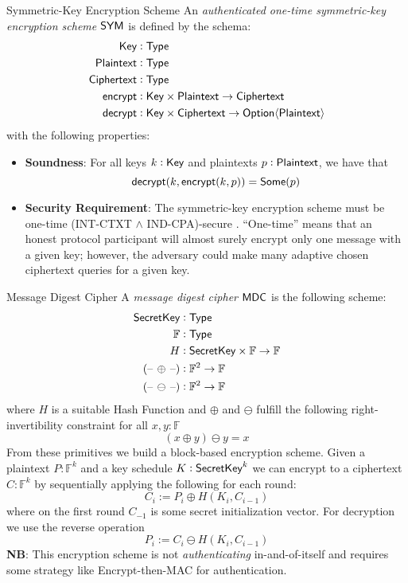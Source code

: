 \begin{definitiontoc}{Symmetric-Key Encryption Scheme} \label{def:abstract-symm}
    An \emph{authenticated one-time symmetric-key encryption scheme} ${\textsf{SYM}}$ is defined by the schema:
    \begin{align*}
        {\textsf{Key}} &: {\textsf{Type}} \\
        {\textsf{Plaintext}} &: {\textsf{Type}} \\
        {\textsf{Ciphertext}} &: {\textsf{Type}} \\
        {\textsf{encrypt}} &: {\textsf{Key}} \times {\textsf{Plaintext}} \to {\textsf{Ciphertext}} \\
        {\textsf{decrypt}} &: {\textsf{Key}} \times {\textsf{Ciphertext}} \to {\textsf{Option}}\langle{{\textsf{Plaintext}}}\rangle
    \end{align*}
    with the following properties:
    \begin{itemize}
        \item \textbf{Soundness}: For all keys $k : {\textsf{Key}}$ and plaintexts $p : {\textsf{Plaintext}}$, we have that
            \[{\textsf{decrypt}}(k, {\textsf{encrypt}}(k, p)) = {\textsf{Some}}(p)\]
        \item \textbf{Security Requirement}: The symmetric-key encryption scheme must be one-time (INT-CTXT $\land$ IND-CPA)-secure \cite{BC2000AC}. ``One-time'' means that an honest protocol participant will almost surely encrypt only one message with a given key; however, the adversary could make many adaptive chosen ciphertext queries for a given key.
    \end{itemize}
\end{definitiontoc}

\begin{definitiontoc}{Message Digest Cipher}
    A \emph{message digest cipher} ${\textsf{MDC}}$ is the following scheme:
    \begin{align*}
        {\textsf{SecretKey}} &: {\textsf{Type}} \\
        \mathbb{F} &: {\textsf{Type}} \\
        H          &: {\textsf{SecretKey}} \times \mathbb{F} \to \mathbb{F} \\
        \left({\textrm{--}}\,\oplus\,{\textrm{--}}\right) &: \mathbb{F}^2 \to \mathbb{F} \\
        \left({\textrm{--}}\,\ominus\,{\textrm{--}}\right) &: \mathbb{F}^2 \to \mathbb{F}
    \end{align*}
    where $H$ is a suitable Hash Function and $\oplus$ and $\ominus$ fulfill the following right-invertibility constraint for all $x, y : \mathbb{F}$
    \[(x \oplus y) \ominus y = x\]
    From these primitives we build a block-based encryption scheme. Given a plaintext $P : \mathbb{F}^k$ and a key schedule $K : {\textsf{SecretKey}}^k$ we can encrypt to a ciphertext $C : \mathbb{F}^k$ by sequentially applying the following for each round:
    \[C_i := P_i \oplus H(K_i, C_{i-1})\]
    where on the first round $C_{-1}$ is some secret initialization vector. For decryption we use the reverse operation
    \[P_i := C_i \ominus H(K_i, C_{i-1})\]
    \textbf{NB}: This encryption scheme is not \emph{authenticating} in-and-of-itself and requires some strategy like Encrypt-then-MAC for authentication.
\end{definitiontoc}

